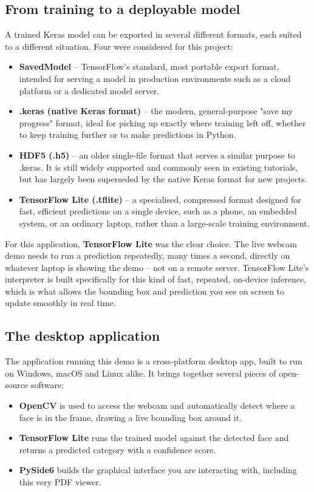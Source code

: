 \documentclass[11 pt , a 4 paper ]{article}
\theoremstyle{definition}
\begin{document}
\subsection{From training to a deployable model}
A trained Keras model can be exported in several different formats, each suited to a different situation. Four were considered for this project:
 
\begin{itemize}[leftmargin=1.5em]
	\item \textbf{SavedModel} -- TensorFlow's standard, most portable export format, intended for serving a model in production environments such as a cloud platform or a dedicated model server.
	\item \textbf{.keras (native Keras format)} -- the modern, general-purpose "save my progress" format, ideal for picking up exactly where training left off, whether to keep training further or to make predictions in Python.
	\item \textbf{HDF5 (.h5)} -- an older single-file format that serves a similar purpose to .keras. It is still widely supported and commonly seen in existing tutorials, but has largely been superseded by the native Keras format for new projects.
	\item \textbf{TensorFlow Lite (.tflite)} -- a specialised, compressed format designed for fast, efficient predictions on a single device, such as a phone, an embedded system, or an ordinary laptop, rather than a large-scale training environment.
\end{itemize}
 
For this application, \textbf{TensorFlow Lite} was the clear choice. The live webcam demo needs to run a prediction repeatedly, many times a second, directly on whatever laptop is showing the demo -- not on a remote server. TensorFlow Lite's interpreter is built specifically for this kind of fast, repeated, on-device inference, which is what allows the bounding box and prediction you see on screen to update smoothly in real time.
 
\subsection{The desktop application}
The application running this demo is a cross-platform desktop app, built to run on Windows, macOS and Linux alike. It brings together several pieces of open-source software:
 
\begin{itemize}[leftmargin=1.5em]
	\item \textbf{OpenCV} is used to access the webcam and automatically detect where a face is in the frame, drawing a live bounding box around it.
	\item \textbf{TensorFlow Lite} runs the trained model against the detected face and returns a predicted category with a confidence score.
	\item \textbf{PySide6} builds the graphical interface you are interacting with, including this very PDF viewer.
\end{itemize}
 
\end{document}

